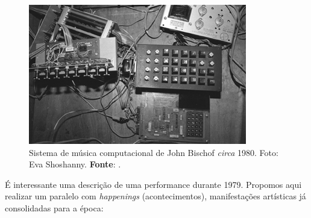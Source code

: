 \begin{figure}[!h]
  \centering
  \includegraphics[scale=0.7]{imagens/siskim1.jpg}
  \caption{Sistema de música computacional de John Bischof \emph{circa} 1980. Foto: Eva Shoshanny\protect\footnotemark. \textbf{Fonte}: .}
  \label{fig:siskim1}
\end{figure}


É interessante uma descrição de uma performance durante 1979. Propomos aqui realizar um paralelo com \emph{happenings} (acontecimentos), manifestações artísticas já consolidadas para a época:

